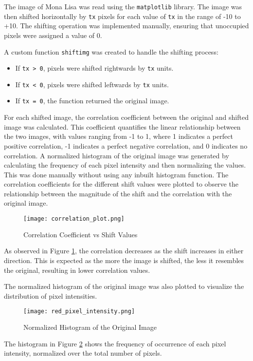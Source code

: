 \begin{tcolorbox}[breakable]
	\begin{sol}
		The image of Mona Lisa was read using the \texttt{matplotlib} library. The image was then shifted horizontally by \texttt{tx} pixels for each value of \texttt{tx} in the range of -10 to +10. The shifting operation was implemented manually, ensuring that unoccupied pixels were assigned a value of 0.

		A custom function \texttt{shiftimg} was created to handle the shifting process:
		\begin{itemize}
			\item If \texttt{tx > 0}, pixels were shifted rightwards by \texttt{tx} units.
			\item If \texttt{tx < 0}, pixels were shifted leftwards by \texttt{tx} units.
			\item If \texttt{tx = 0}, the function returned the original image.
		\end{itemize}

		For each shifted image, the correlation coefficient between the original and shifted image was calculated. This coefficient quantifies the linear relationship between the two images, with values ranging from -1 to 1, where 1 indicates a perfect positive correlation, -1 indicates a perfect negative correlation, and 0 indicates no correlation.
		A normalized histogram of the original image was generated by calculating the frequency of each pixel intensity and then normalizing the values. This was done manually without using any inbuilt histogram function.
		\newpage
		The correlation coefficients for the different shift values were plotted to observe the relationship between the magnitude of the shift and the correlation with the original image.

		\begin{figure}[H]
			\centering
			\texttt{[image: correlation\_plot.png]}
			\caption{Correlation Coefficient vs Shift Values}
			\label{fig:corr_plot}
		\end{figure}


		As observed in Figure \ref{fig:corr_plot}, the correlation decreases as the shift increases in either direction. This is expected as the more the image is shifted, the less it resembles the original, resulting in lower correlation values.

		The normalized histogram of the original image was also plotted to visualize the distribution of pixel intensities.

		\begin{figure}[H]
			\centering
			\texttt{[image: red\_pixel\_intensity.png]}
			\caption{Normalized Histogram of the Original Image}
			\label{fig:hist_plot}
		\end{figure}

		The histogram in Figure \ref{fig:hist_plot} shows the frequency of occurrence of each pixel intensity, normalized over the total number of pixels.




	\end{sol}
\end{tcolorbox}
